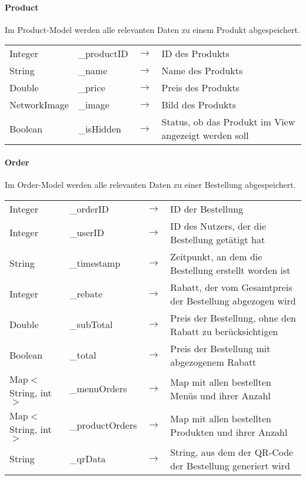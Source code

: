 \paragraph{Product}

Im Product-Model werden alle relevanten Daten zu einem Produkt abgespeichert.

\begin{tabular}{l l r l}
    Integer & \_productID & $\rightarrow$ & ID des Produkts\\
    String & \_name & $\rightarrow$ & Name des Produkts\\
    Double & \_price & $\rightarrow$ & Preis des Produkts\\
    NetworkImage & \_image & $\rightarrow$ & Bild des Produkts\\
    Boolean & \_isHidden & $\rightarrow$ & Status, ob das Produkt im View angezeigt werden soll
\end{tabular}

\paragraph{Order}

Im Order-Model werden alle relevanten Daten zu einer Bestellung abgespeichert.

\begin{tabular}{l l r l}
    Integer & \_orderID & $\rightarrow$ & ID der Bestellung\\
    Integer & \_userID & $\rightarrow$ & ID des Nutzers, der die Bestellung getätigt hat\\
    String & \_timestamp & $\rightarrow$ & Zeitpunkt, an dem die Bestellung erstellt worden ist\\
    Integer & \_rebate & $\rightarrow$ & Rabatt, der vom Gesamtpreis der Bestellung abgezogen wird\\
    Double & \_subTotal & $\rightarrow$ & Preis der Bestellung, ohne den Rabatt zu berücksichtigen\\
    Boolean & \_total & $\rightarrow$ & Preis der Bestellung mit abgezogenem Rabatt\\
    Map$<$String, int$>$ & \_menuOrders & $\rightarrow$ & Map mit allen bestellten Menüs und ihrer Anzahl\\
    Map$<$String, int$>$ & \_productOrders & $\rightarrow$ & Map mit allen bestellten Produkten und ihrer Anzahl\\
    String & \_qrData & $\rightarrow$ & String, aus dem der QR-Code der Bestellung generiert wird\\
\end{tabular}

